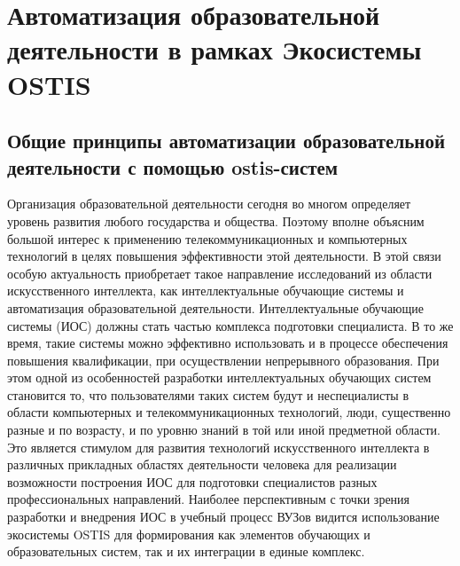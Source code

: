 \chapter{Автоматизация образовательной деятельности в рамках Экосистемы OSTIS}
\label{chapter_learning_systems}


\section{Общие принципы автоматизации образовательной деятельности с помощью ostis-систем}

Организация образовательной деятельности сегодня во многом определяет уровень развития любого государства и общества. Поэтому вполне объясним большой интерес к применению телекоммуникационных и компьютерных технологий в целях повышения эффективности этой деятельности. В этой связи особую актуальность приобретает такое направление исследований из области искусственного интеллекта, как интеллектуальные обучающие системы и автоматизация образовательной деятельности. Интеллектуальные обучающие системы (ИОС) должны стать частью комплекса подготовки специалиста. В то же время, такие системы можно эффективно использовать и в процессе обеспечения повышения квалификации, при осуществлении непрерывного образования. При этом одной из особенностей разработки интеллектуальных обучающих систем становится то, что пользователями таких систем будут и неспециалисты в области компьютерных и телекоммуникационных технологий, люди, существенно разные и по возрасту, и по уровню знаний в той или иной предметной области. Это является стимулом для развития технологий искусственного интеллекта в различных прикладных областях деятельности человека для реализации возможности построения ИОС для подготовки специалистов разных профессиональных направлений. Наиболее перспективным с точки зрения разработки и внедрения ИОС в учебный процесс ВУЗов видится использование экосистемы OSTIS для формирования как элементов обучающих и образовательных систем, так и их интеграции в единые комплекс.

